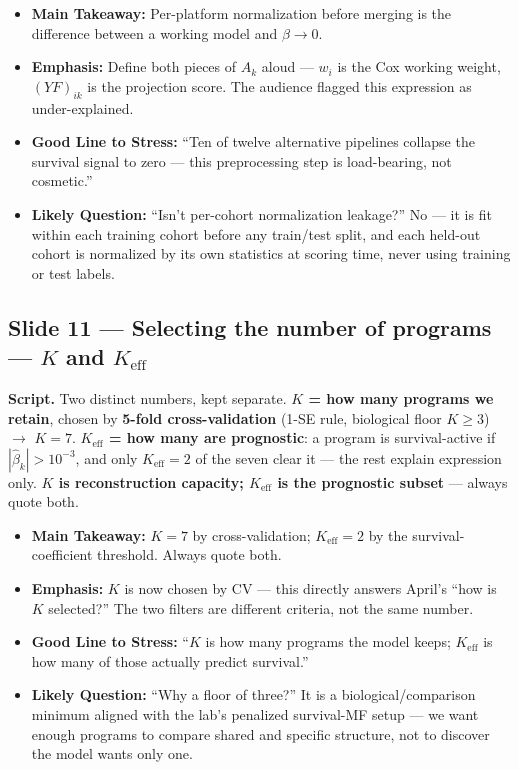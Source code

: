 \documentclass[11pt]{article}
\newcommand{\scriptlabel}{\textbf{Script. }}
\newcommand{\sectionlabel}[1]{\textbf{#1}}
\newcommand{\key}[1]{\textcolor{keyblue}{\textbf{#1}}}        %
\newcommand{\num}[1]{\textcolor{keycar}{\textbf{\uline{#1}}}} %
\begin{document}
\begin{itemize}
\item \sectionlabel{Main Takeaway:} Per-platform normalization before merging is the difference
between a working model and $\beta \to 0$.
\item \sectionlabel{Emphasis:} Define both pieces of $A_k$ aloud --- $w_i$ is the Cox working weight,
$(YF)_{ik}$ is the projection score. The audience flagged this expression as under-explained.
\item \sectionlabel{Good Line to Stress:} ``Ten of twelve alternative pipelines collapse the
survival signal to zero --- this preprocessing step is load-bearing, not cosmetic.''
\item \sectionlabel{Likely Question:} ``Isn't per-cohort normalization leakage?'' No --- it is fit
within each training cohort before any train/test split, and each held-out cohort is normalized by
its own statistics at scoring time, never using training or test labels.
\end{itemize}

\subsection*{Slide 11 --- Selecting the number of programs --- $K$ and $K_{\text{eff}}$}
\scriptlabel Two distinct numbers, kept separate. \key{$K$ = how many programs we retain}, chosen by
\key{5-fold cross-validation} (1-SE rule, biological floor $K \ge 3$) $\to$ \num{$K = 7$}.
\key{$K_{\text{eff}}$ = how many are prognostic}: a program is survival-active if \key{$|\hat\beta_k|
> 10^{-3}$}, and only \num{$K_{\text{eff}} = 2$} of the seven clear it --- the rest explain
expression only. \key{$K$ is reconstruction capacity; $K_{\text{eff}}$ is the prognostic subset} ---
always quote both.

\begin{itemize}
\item \sectionlabel{Main Takeaway:} $K = 7$ by cross-validation; $K_{\text{eff}} = 2$ by the
survival-coefficient threshold. Always quote both.
\item \sectionlabel{Emphasis:} $K$ is now chosen by CV --- this directly answers April's ``how is
$K$ selected?'' The two filters are different criteria, not the same number.
\item \sectionlabel{Good Line to Stress:} ``$K$ is how many programs the model keeps;
$K_{\text{eff}}$ is how many of those actually predict survival.''
\item \sectionlabel{Likely Question:} ``Why a floor of three?'' It is a biological/comparison
minimum aligned with the lab's penalized survival-MF setup --- we want enough programs to compare
shared and specific structure, not to discover the model wants only one.
\end{itemize}
\end{document}
